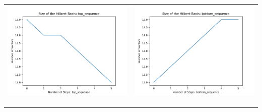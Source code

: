 \documentclass[10pt]{article}
\begin{document}
\begin{tabular}{c|c}
\begin{minipage}{.4\textwidth}
\includegraphics[width=\textwidth]{"DATA/5d/5 generators 2 bound G/top_sequence SIZE"}
\end{minipage} &
\begin{minipage}{.4\textwidth}
\includegraphics[width=\textwidth]{"DATA/5d/5 generators 2 bound G bottomup/bottom_sequence SIZE"}
\end{minipage} \\ \\
\hline \\\begin{minipage}{.4\textwidth}

\end{minipage}
\end{tabular}
\end{document}
